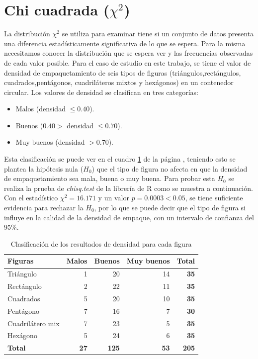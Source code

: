 \documentclass{article}
\begin{document}
\section{Chi cuadrada ($\chi^{2}$)}
 La distribución $\chi^{2}$ se utiliza  para examinar tiene si un conjunto de datos presenta una diferencia estadísticamente significativa de lo que se espera. Para la misma necesitamos conocer la distribución que se espera ver y las frecuencias observadas de cada valor posible.
 Para el caso de estudio en este trabajo, se tiene el valor de densidad de empaquetamiento de seis tipos de figuras (triángulos,rectángulos, cuadrados,pentágonos, cuadriláteros mixtos y hexágonos) en un contenedor circular. Los valores de densidad se clasifican en tres categorías:
 \begin{itemize}
     \item Malos (densidad $\leq 0.40$).
     \item Buenos ($0.40>$ densidad $\leq 0.70$).
     \item Muy buenos (densidad $> 0.70$).
 \end{itemize}
 Esta clasificación se puede ver en el cuadro \ref{tab:4} de la página \pageref{tab:4}, teniendo esto se plantea la hipótesis nula ($H_{0}$) que el tipo de figura no afecta en que la densidad de empaquetamiento sea mala, buena o muy buena. Para probar esta $H_{0}$ se realiza la prueba de \textit{chisq.test} de la librería de R como se muestra a continuación.
 Con el estadístico $\chi^{2} = 16.171$ y un valor $p = 0.0003 < 0.05$, se tiene suficiente evidencia para rechazar la $H_{0}$, por lo que se puede decir que el tipo de figura si influye en la calidad de la densidad de empaque, con un intervalo de confianza del 95\%. 
\begin{table}[H]
  \centering
  \caption{Clasificación de los resultados de densidad para cada figura}
    \begin{tabular}{lrrrr}
    \toprule
    Figuras & \multicolumn{1}{l}{Malos} & \multicolumn{1}{l}{Buenos} & \multicolumn{1}{l}{Muy buenos} & \multicolumn{1}{l}{\textbf{Total}} \\
    \midrule
    Triángulo  & 1     & 20    & 14    & \textbf{35} \\
    Rectángulo & 2     & 22    & 11    & \textbf{35} \\
    Cuadrados & 5     & 20    & 10    & \textbf{35} \\
    Pentágono & 7     & 16    & 7     & \textbf{30} \\
    Cuadrilátero mix & 7     & 23    & 5     & \textbf{35} \\
    Hexágono & 5     & 24    & 6     & \textbf{35} \\
    \textbf{Total} & \textbf{27} & \textbf{125} & \textbf{53} & \textbf{205} \\
    \bottomrule
    \end{tabular}%
  \label{tab:4}%
\end{table}%
\end{document}
